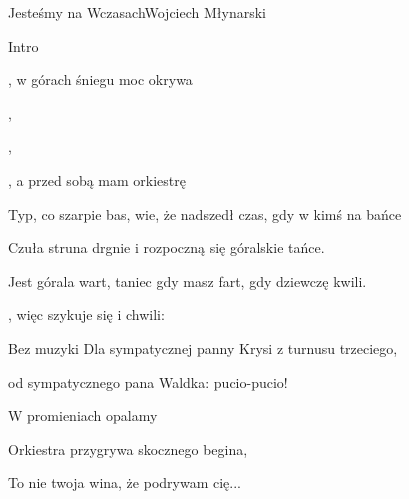\begin{song}{Jesteśmy na Wczasach}{}{}{Wojciech Młynarski}{}{}
  \begin{SBBracket}{Intro}
       
  \end{SBBracket}
  \begin{SBVerse}
    , w górach śniegu moc okrywa 

    ,  

    ,  

    , a przed sobą mam orkiestrę 
  \end{SBVerse}
  \begin{SBVerse}
    Typ, co szarpie bas, wie, że nadszedł czas, gdy w kimś na bańce

    Czuła struna drgnie i rozpoczną się góralskie tańce.

    Jest górala wart, taniec gdy masz fart, gdy dziewczę kwili.

    , więc szykuje się i  chwili: 
  \end{SBVerse}

  \begin{SBBracket}{Bez muzyki}
    Dla sympatycznej panny Krysi z turnusu trzeciego,

    od sympatycznego pana Waldka: pucio-pucio!
  \end{SBBracket}
  \begin{SBChorus}

    W promieniach   opalamy 

    Orkiestra przygrywa skocznego begina,

    To nie twoja wina, że podrywam cię...
  \end{SBChorus}
  \begin{SBVerse}



     



\end{SBVerse}
\end{song}
